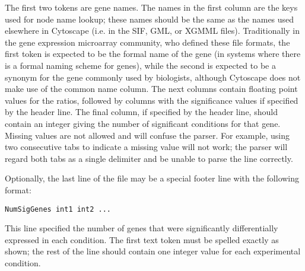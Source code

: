 The first two tokens are gene names. The names in the first column are the keys
used for node name lookup; these names should be the same as the names used
elsewhere in Cytoscape (i.e. in the SIF, GML, or XGMML files). Traditionally in
the gene expression microarray community, who defined these file formats, the
first token is expected to be the formal name of the gene (in systems where
there is a formal naming scheme for genes), while the second is expected to be
a synonym for the gene commonly used by biologists, although Cytoscape does not
make use of the common name column. The next columns contain floating point
values for the ratios, followed by columns with the significance values if
specified by the header line. The final column, if specified by the header
line, should contain an integer giving the number of significant conditions for
that gene. Missing values are not allowed and will confuse the parser. For
example, using two consecutive tabs to indicate a missing value will not work;
the parser will regard both tabs as a single delimiter and be unable to parse
the line correctly. 

Optionally, the last line of the file may be a special footer line with the
following format: 
 \begin{verbatim}
NumSigGenes int1 int2 ...
\end{verbatim}
This line specified the number of genes that were significantly differentially
expressed in each condition. The first text token must be spelled exactly as
shown; the rest of the line should contain one integer value for each
experimental condition. 
